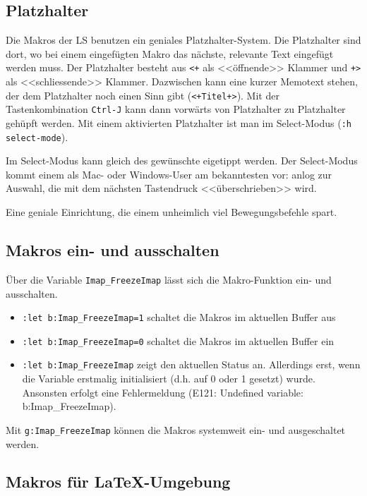 \documentclass[a4paper,parskip=half,draft=true,DIV=15]{scrartcl}
\begin{document}
\subsection{Platzhalter}

Die Makros der LS benutzen ein geniales Platzhalter-System. Die Platzhalter sind dort, wo bei einem eingefügten Makro das
nächste, relevante Text eingefügt werden muss. Der Platzhalter besteht aus \texttt{<+} als <<öffnende>> Klammer und
\texttt{+>} als <<schliessende>> Klammer. Dazwischen kann eine kurzer Memotext stehen, der dem Platzhalter noch einen
Sinn gibt (\texttt{<+Titel+>}). Mit der Tastenkombination \texttt{Ctrl-J} kann dann vorwärts von Platzhalter zu
Platzhalter gehüpft werden. Mit einem aktivierten Platzhalter ist man im Select-Modus (\texttt{:h select-mode}).

Im Select-Modus kann gleich des gewünschte eigetippt werden. Der Select-Modus
kommt einem als Mac- oder Windows-User am bekanntesten vor: anlog zur Auswahl, die mit dem nächsten Tastendruck
<<überschrieben>> wird.

Eine geniale Einrichtung, die einem unheimlich viel Bewegungsbefehle spart.

\subsection{Makros ein- und ausschalten}

Über die Variable \texttt{Imap\_FreezeImap} lässt sich die Makro-Funktion ein- und ausschalten.

\begin{itemize}
  \item \texttt{:let b:Imap\_FreezeImap=1} schaltet die Makros im aktuellen Buffer aus
  \item \texttt{:let b:Imap\_FreezeImap=0} schaltet die Makros im aktuellen Buffer ein
  \item \texttt{:let b:Imap\_FreezeImap} zeigt den aktuellen Status an. Allerdings erst, wenn die Variable
    erstmalig initialisiert (d.h. auf 0 oder 1 gesetzt) wurde. Ansonsten erfolgt eine Fehlermeldung
    (E121: Undefined variable: b:Imap\_FreezeImap).
\end{itemize}

Mit \texttt{g:Imap\_FreezeImap} können die Makros systemweit ein- und ausgeschaltet werden.


\subsection{Makros für LaTeX-Umgebung}
\end{document}
